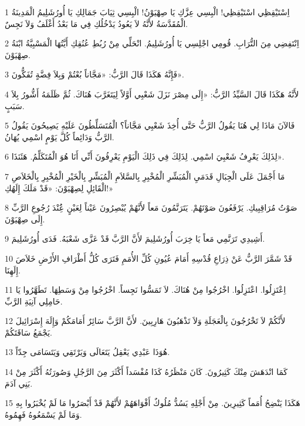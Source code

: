 \par 1 اِسْتَيْقِظِي اسْتَيْقِظِي! الْبِسِي عِزَّكِ يَا صِهْيَوْنُ! الْبِسِي ثِيَابَ جَمَالِكِ يَا أُورُشَلِيمُ الْمَدِينَةُ الْمُقَدَّسَةُ لأَنَّهُ لاَ يَعُودُ يَدْخُلُكِ فِي مَا بَعْدُ أَغْلَفُ وَلاَ نَجِسٌ.
\par 2 اِنْتَفِضِي مِنَ التُّرَابِ. قُومِي اجْلِسِي يَا أُورُشَلِيمُ. انْحَلِّي مِنْ رُبُطِ عُنُقِكِ أَيَّتُهَا الْمَسْبِيَّةُ ابْنَةُ صِهْيَوْنَ.
\par 3 فَإِنَّهُ هَكَذَا قَالَ الرَّبُّ: «مَجَّاناً بُعْتُمْ وَبِلاَ فِضَّةٍ تُفَكُّونَ».
\par 4 لأَنَّهُ هَكَذَا قَالَ السَّيِّدُ الرَّبُّ: «إِلَى مِصْرَ نَزَلَ شَعْبِي أَوَّلاً لِيَتَغَرَّبَ هُنَاكَ. ثُمَّ ظَلَمَهُ أَشُّورُ بِلاَ سَبَبٍ.
\par 5 فَالآنَ مَاذَا لِي هُنَا يَقُولُ الرَّبُّ حَتَّى أُخِذَ شَعْبِي مَجَّاناً؟ الْمُتَسَلِّطُونَ عَلَيْهِ يَصِيحُونَ يَقُولُ الرَّبُّ وَدَائِماً كُلَّ يَوْمٍ اسْمِي يُهَانُ.
\par 6 لِذَلِكَ يَعْرِفُ شَعْبِيَ اسْمِي. لِذَلِكَ فِي ذَلِكَ الْيَوْمِ يَعْرِفُونَ أَنِّي أَنَا هُوَ الْمُتَكَلِّمُ. هَئَنَذَا».
\par 7 مَا أَجْمَلَ عَلَى الْجِبَالِ قَدَمَيِ الْمُبَشِّرِ الْمُخْبِرِ بِالسَّلاَمِ الْمُبَشِّرِ بِالْخَيْرِ الْمُخْبِرِ بِالْخَلاَصِ الْقَائِلِ لِصِهْيَوْنَ: «قَدْ مَلَكَ إِلَهُكِ!»
\par 8 صَوْتُ مُرَاقِبِيكِ. يَرْفَعُونَ صَوْتَهُمْ. يَتَرَنَّمُونَ مَعاً لأَنَّهُمْ يُبْصِرُونَ عَيْناً لِعَيْنٍ عَُِنْدَ رُجُوعِ الرَّبِّ إِلَى صِهْيَوْنَ.
\par 9 أَشِيدِي تَرَنَّمِي مَعاً يَا خِرَبَ أُورُشَلِيمَ لأَنَّ الرَّبَّ قَدْ عَزَّى شَعْبَهُ. فَدَى أُورُشَلِيمَ.
\par 10 قَدْ شَمَّرَ الرَّبُّ عَنْ ذِرَاعِ قُدْسِهِ أَمَامَ عُيُونِ كُلِّ الأُمَمِ فَتَرَى كُلُّ أَطْرَافِ الأَرْضِ خَلاَصَ إِلَهِنَا.
\par 11 اِعْتَزِلُوا. اعْتَزِلُوا. اخْرُجُوا مِنْ هُنَاكَ. لاَ تَمَسُّوا نَجِساً. اخْرُجُوا مِنْ وَسَطِهَا. تَطَهَّرُوا يَا حَامِلِي آنِيَةِ الرَّبِّ.
\par 12 لأَنَّكُمْ لاَ تَخْرُجُونَ بِالْعَجَلَةِ وَلاَ تَذْهَبُونَ هَارِبِينَ. لأَنَّ الرَّبَّ سَائِرٌ أَمَامَكُمْ وَإِلَهَ إِسْرَائِيلَ يَجْمَعُ سَاقَتَكُمْ.
\par 13 هُوَذَا عَبْدِي يَعْقِلُ يَتَعَالَى وَيَرْتَقِي وَيَتَسَامَى جِدّاً.
\par 14 كَمَا انْدَهَشَ مِنْكَ كَثِيرُونَ. كَانَ مَنْظَرُهُ كَذَا مُفْسَداً أَكْثَرَ مِنَ الرَّجُلِ وَصُورَتُهُ أَكْثَرَ مِنْ بَنِي آدَمَ.
\par 15 هَكَذَا يَنْضِحُ أُمَماً كَثِيرِينَ. مِنْ أَجْلِهِ يَسُدُّ مُلُوكٌ أَفْوَاهَهُمْ لأَنَّهُمْ قَدْ أَبْصَرُوا مَا لَمْ يُخْبَرُوا بِهِ وَمَا لَمْ يَسْمَعُوهُ فَهِمُوهُ.


